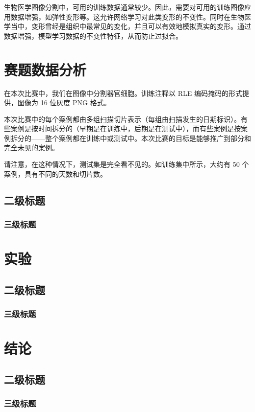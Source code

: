 \documentclass[letterpaper, 10pt, conference, twoside]{ieeeconf}
\begin{document}
生物医学图像分割中，可用的训练数据通常较少。因此，需要对可用的训练图像应用数据增强，如弹性变形等。这允许网络学习对此类变形的不变性。同时在生物医学当中，变形曾经是组织中最常见的变化，并且可以有效地模拟真实的变形。通过数据增强，模型学习数据的不变性特征，从而防止过拟合。


\section{赛题数据分析}

在本次比赛中，我们在图像中分割器官细胞。训练注释以 RLE 编码掩码的形式提供，图像为 16 位灰度 PNG 格式。

本次比赛中的每个案例都由多组扫描切片表示（每组由扫描发生的日期标识）。有些案例是按时间拆分的（早期是在训练中，后期是在测试中），而有些案例是按案例拆分的——整个案例都在训练中或测试中。本次比赛的目标是能够推广到部分和完全未见的案例。

请注意，在这种情况下，测试集是完全看不见的。如训练集中所示，大约有 50 个案例，具有不同的天数和切片数。



\subsection{二级标题}
\subsubsection{三级标题}

\section{实验}
\subsection{二级标题}
\subsubsection{三级标题}

\section{结论}
\subsection{二级标题}
\subsubsection{三级标题}
\end{document}
